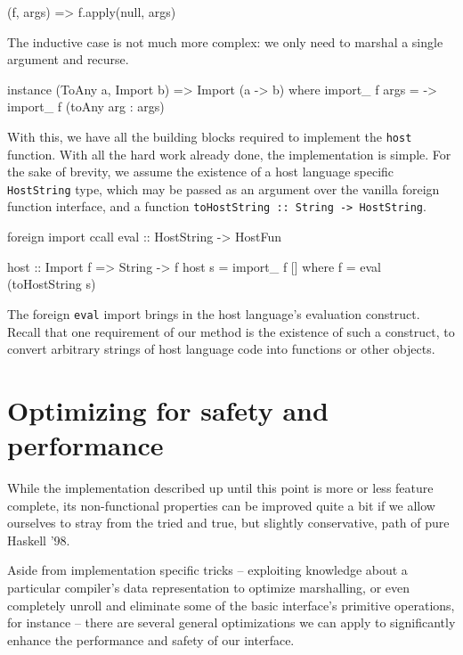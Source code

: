 \documentclass[preprint]{sigplanconf}
\begin{document}
\begin{code}
  (f, args) => f.apply(null, args)
\end{code}

The inductive case is not much more complex: we only need to marshal a single
argument and recurse.

\begin{code}
  instance (ToAny a, Import b) =>
           Import (a -> b) where
    import_ f args =
      \arg -> import_ f (toAny arg : args)
\end{code}

With this, we have all the building blocks required to implement the
\lstinline!host! function. With all the hard work already done, the
implementation is simple. For the sake of brevity, we assume the
existence of a host language specific \lstinline!HostString! type, which may
be passed as an argument over the vanilla foreign function interface, and a
function \lstinline!toHostString :: String -> HostString!.

\begin{code}
  foreign import ccall
    eval :: HostString -> HostFun

  host :: Import f => String -> f
  host s = import_ f []
    where
      f = eval (toHostString s)
\end{code}

The foreign \lstinline!eval! import brings in the host language's evaluation
construct. Recall that one requirement of our method is the existence of such
a construct, to convert arbitrary strings of host language code into functions
or other objects.

\section{Optimizing for safety and performance}
\label{sec:optimizations}
While the implementation described up until this point is more or less
feature complete, its non-functional properties can be improved quite a bit
if we allow ourselves to stray from the tried and true, but slightly
conservative, path of pure Haskell '98.

Aside from implementation specific tricks -- exploiting knowledge about a
particular compiler's data representation to optimize marshalling, or even
completely unroll and eliminate some of the basic interface's primitive
operations, for instance -- there are several general optimizations we can
apply to significantly enhance the performance and safety of our interface.
\end{document}
